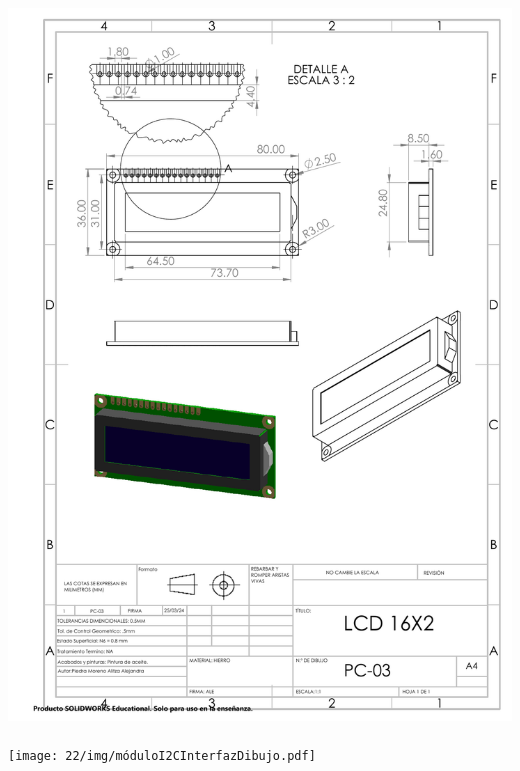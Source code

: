 \begin{center}

\includegraphics[width=.9\textwidth]{22/img/lcdDibujo.PDF}~\\[15cm]

\texttt{[image: 22/img/móduloI2CInterfazDibujo.pdf]}~\\[15cm]


\end{center}
